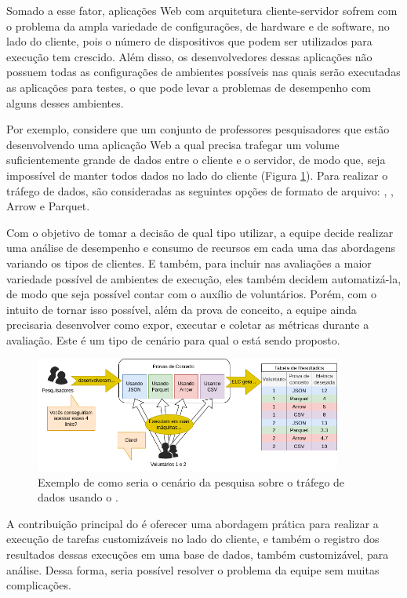 \documentclass[12pt]{tcc}
\begin{document}
	Somado a esse fator, aplicações Web com arquitetura cliente-servidor sofrem com o problema da ampla variedade de configurações, de hardware e de software, no lado do cliente, pois o número de dispositivos que podem ser utilizados para execução tem crescido. Além disso, os desenvolvedores dessas aplicações não possuem todas as configurações de ambientes possíveis nas quais serão executadas as aplicações para testes, o que pode levar a problemas de desempenho com alguns desses ambientes. 

	Por exemplo, considere que um conjunto de professores pesquisadores que estão desenvolvendo uma aplicação Web a qual precisa trafegar um volume suficientemente grande de dados entre o cliente e o servidor, de modo que, seja impossível de manter todos dados no lado do cliente (Figura \ref{fig:exemplo-tipo-de-dado}). Para realizar o tráfego de dados, são consideradas as seguintes opções de formato de arquivo: , , Arrow e Parquet. 

	Com o objetivo de tomar a decisão de qual tipo utilizar, a equipe decide realizar uma análise de desempenho e consumo de recursos em cada uma das abordagens variando os tipos de clientes. E também, para incluir nas avaliações a maior variedade possível de ambientes de execução, eles também decidem automatizá-la, de modo que seja possível contar com o auxílio de voluntários. Porém, com o intuito de tornar isso possível, além da prova de conceito, a equipe ainda precisaria desenvolver como expor, executar e coletar as métricas durante a avaliação. Este é um tipo de cenário para qual o  está sendo proposto. 

	\begin{figure}[!ht]
		\centering
		\includegraphics[width=0.9\textwidth]{figures/exemplo-tipo-de-dado.png}
		\caption{Exemplo de como seria o cenário da pesquisa sobre o tráfego de dados usando o .}
		\label{fig:exemplo-tipo-de-dado}
	\end{figure}

	A contribuição principal do  é oferecer uma abordagem prática para realizar a execução de tarefas customizáveis no lado do cliente, e também o registro dos resultados dessas execuções em uma base de dados, também customizável, para análise. Dessa forma, seria possível resolver o problema da equipe sem muitas complicações. 
\end{document}

